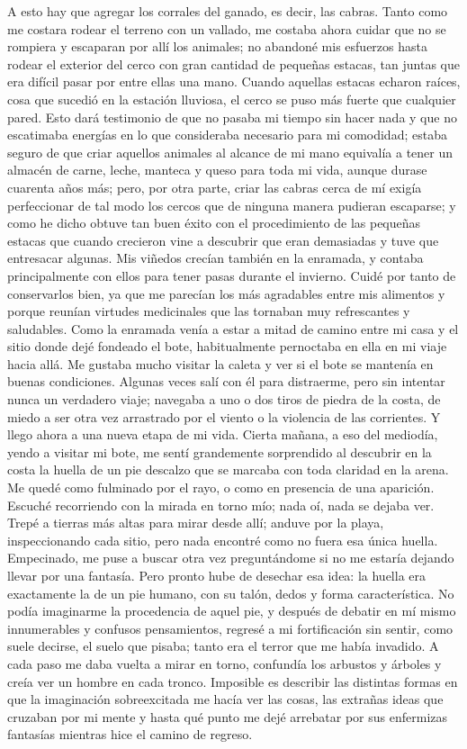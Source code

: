 \documentclass{novela}
\begin{document}
    A esto hay que agregar los corrales del ganado, es decir, las cabras. Tanto como me costara rodear el terreno con un vallado, me costaba ahora cuidar que no se rompiera y escaparan por allí los animales; no abandoné mis esfuerzos hasta rodear el exterior del cerco con gran cantidad de pequeñas estacas, tan juntas que era difícil pasar por entre ellas una mano. Cuando aquellas estacas echaron raíces, cosa que sucedió en la estación lluviosa, el cerco se puso más fuerte que cualquier pared.
    Esto dará testimonio de que no pasaba mi tiempo sin hacer nada y que no escatimaba energías en lo que consideraba necesario para mi comodidad; estaba seguro de que criar aquellos animales al alcance de mi mano equivalía a tener un almacén de carne, leche, manteca y queso para toda mi vida, aunque durase cuarenta años más; pero, por otra parte, criar las cabras cerca de mí exigía perfeccionar de tal modo los cercos que de ninguna manera pudieran escaparse; y como he dicho obtuve tan buen éxito con el procedimiento de las pequeñas estacas que cuando crecieron vine a descubrir que eran demasiadas y tuve que entresacar algunas.
    Mis viñedos crecían también en la enramada, y contaba principalmente con ellos para tener pasas durante el invierno. Cuidé por tanto de conservarlos bien, ya que me parecían los más agradables entre mis alimentos y porque reunían virtudes medicinales que las tornaban muy refrescantes y saludables.
    Como la enramada venía a estar a mitad de camino entre mi casa y el sitio donde dejé fondeado el bote, habitualmente pernoctaba en ella en mi viaje hacia allá. Me gustaba mucho visitar la caleta y ver si el bote se mantenía en buenas condiciones. Algunas veces salí con él para distraerme, pero sin intentar nunca un verdadero viaje; navegaba a uno o dos tiros de piedra de la costa, de miedo a ser otra vez arrastrado por el viento o la violencia de las corrientes.
    Y llego ahora a una nueva etapa de mi vida. Cierta mañana, a eso del mediodía, yendo a visitar mi bote, me sentí grandemente sorprendido al descubrir en la costa la huella de un pie descalzo que se marcaba con toda claridad en la arena.
    Me quedé como fulminado por el rayo, o como en presencia de una aparición. Escuché recorriendo con la mirada en torno mío; nada oí, nada se dejaba ver. Trepé a tierras más altas para mirar desde allí; anduve por la playa, inspeccionando cada sitio, pero nada encontré como no fuera esa única huella. Empecinado, me puse a buscar otra vez preguntándome si no me estaría dejando llevar por una fantasía. Pero pronto hube de desechar esa idea: la huella era exactamente la de un pie humano, con su talón, dedos y forma característica. No podía imaginarme la procedencia de aquel pie, y después de debatir en mí mismo innumerables y confusos pensamientos, regresé a mi fortificación sin sentir, como suele decirse, el suelo que pisaba; tanto era el terror que me había invadido. A cada paso me daba vuelta a mirar en torno, confundía los arbustos y árboles y creía ver un hombre en cada tronco. Imposible es describir las distintas formas en que la imaginación sobreexcitada me hacía ver las cosas, las extrañas ideas que cruzaban por mi mente y hasta qué punto me dejé arrebatar por sus enfermizas fantasías mientras hice el camino de regreso.
\end{document}
